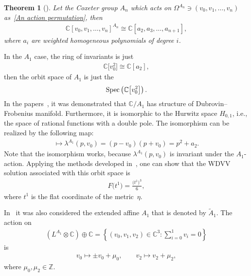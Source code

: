 \documentclass[10pt,a4paper]{amsart}
\numberwithin{equation}{section}
\newtheorem{Theorem}{Theorem}[section]
\begin{document}
\begin{Theorem}[\cite{N.Bourbaki}]
Let the Coxeter group $A_n$ which acts on $\Omega^{A_n}\ni (v_0,v_1,\dots,v_n)$ as~\eqref{An action permutation}, then
\begin{gather*}
\mathbb{C}[v_0,v_1,\dots,v_n]^{A_n}\cong \mathbb{C}[a_2,a_3,\dots,a_{n+1}],
\end{gather*}
where $a_i$ are weighted homogeneous polynomials of degree $i$.
\end{Theorem}

 In the $A_1$ case, the ring of invariants is just
\begin{gather*}
\mathbb{C}\big[v_0^2\big]\cong\mathbb{C}[a_2] ,
\end{gather*}
 then the orbit space of $A_1$ is just the
 \begin{gather*}
 \mathop{\rm Spec} \left(\mathbb{C}\big[v_0^2\big]\right).
 \end{gather*}
 In the papers~\cite{B.Dubrovin2,B.Dubrovin1}, it was demonstrated that $\mathbb{C}/A_1$ has structure of Dubrovin--Frobenius manifold. Furthermore, it is isomorphic to the Hurwitz space $H_{0,1}$, i.e., the space of rational functions with a double pole. The isomorphism can be realized by the following map:
\begin{gather*}
[v_0]\mapsto \lambda^{A_1}(p,v_0)=(p-v_0)(p+v_0)=p^2+a_2.
\end{gather*}
Note that the isomorphism works, because $\lambda^{A_1}(p,v_0)$ is invariant under the $A_1$-action. Applying the methods developed in~\cite{B.Dubrovin2,B.Dubrovin1}, one can show that the WDVV solution associated with this orbit space is
\begin{gather*}
F\big(t^1\big)=\frac{\big(t^1\big)^3}{6},
\end{gather*}
where $t^1$ is the flat coordinate of the metric~$\eta$.

In~\cite{B.Dubrovin2, B.DubrovinandY.Zhang} it was also considered the extended affine $A_1$ that is denoted by $\tilde A_1$. The action on
\begin{gather*}
\left(L^{A_1}\otimes\mathbb{C}\right)\oplus \mathbb{C}
=\left\{(v_0,v_1,v_2)\in \mathbb{C}^3\colon \sum_{i=0}^1 v_i=0 \right\}
\end{gather*}
is{\samepage
\begin{gather*}
v_0\mapsto \pm v_0+\mu_0,\qquad
v_2\mapsto v_2+\mu_2,
\end{gather*}
where $\mu_0, \mu_2 \in \mathbb{Z}$.}
\end{document}
